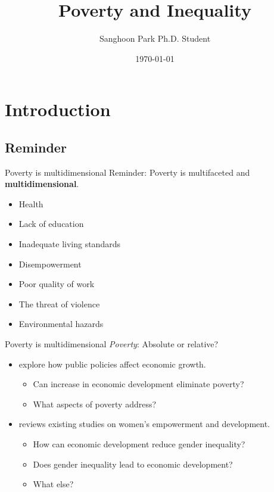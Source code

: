 \documentclass[xcolor=dvipsnames, t]{beamer}
\title{Poverty and Inequality}
\date{\today}
\author[Sanghoon Park]{Sanghoon Park \newline \newline  \footnotesize{Ph.D. Student}}
\institute[UofSC]{Department of Political Science}
\begin{document}
	
	\begin{frame}
		\titlepage
	\end{frame}
	\begin{frame}
		\tableofcontents
	\end{frame}
	
	
	\section{Introduction}
	\subsection{Reminder}
	\begin{frame}[fragile]{Poverty is multidimensional}
		Reminder: Poverty is multifaceted and \textbf{multidimensional}.
		\begin{itemize}
			\item Health
			\item Lack of education
			\item Inadequate living standards
			\item Disempowerment
			\item Poor quality of work
			\item The threat of violence
			\item Environmental hazards
		\end{itemize}
	\end{frame}
	
	\begin{frame}[fragile]{Poverty is multidimensional}
		\textit{Poverty}: Absolute or relative?
		\begin{itemize}
			\item \citet{king:rebelo:1990} explore how public policies affect economic growth.
			\begin{itemize}
				\item Can increase in economic development eliminate poverty?
				\item What aspects of poverty \citet{king:rebelo:1990} address?
			\end{itemize}
			\item \citet{duflo:2012} reviews existing studies on women's empowerment and development.
			\begin{itemize}
				\item How can economic development reduce gender inequality?
				\item Does gender inequality lead to economic development?
				\item What else?
			\end{itemize}
		\end{itemize}
	\end{frame}
	
\end{document}

